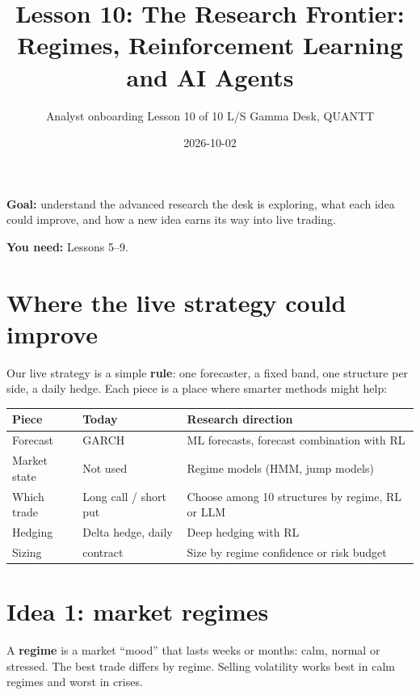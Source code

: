 \documentclass{article}
\title{Lesson 10: The Research Frontier: Regimes, Reinforcement Learning and AI Agents}
\author{Analyst onboarding \textperiodcentered{} Lesson 10 of 10 \textperiodcentered{} L/S Gamma Desk, QUANTT}
\date{2026-10-02}
\begin{document}
\maketitle

\textbf{Goal:} understand the advanced research the desk is exploring, what each idea could improve, and how a new idea earns its way into live trading.

\textbf{You need:} Lessons 5--9.

\section{Where the live strategy could improve}

Our live strategy is a simple \textbf{rule}: one forecaster, a fixed band, one structure per side, a daily hedge. Each piece is a place where smarter methods might help:

\begin{center}\small
\begin{tabularx}{\linewidth}{l >{\raggedright\arraybackslash}X >{\raggedright\arraybackslash}X}
\toprule
\textbf{Piece} & \textbf{Today} & \textbf{Research direction} \\
\midrule
Forecast & GARCH & ML forecasts, forecast combination with RL \\
Market state & Not used & Regime models (HMM, jump models) \\
Which trade & Long call /\allowbreak{} short put & Choose among 10 structures by regime, RL or LLM \\
Hedging & Delta hedge, daily & Deep hedging with RL \\
Sizing & 1 contract & Size by regime confidence or risk budget \\
\bottomrule
\end{tabularx}
\end{center}

\section{Idea 1: market regimes}

A \textbf{regime} is a market ``mood'' that lasts weeks or months: calm, normal or stressed. The best trade differs by regime. Selling volatility works best in calm regimes and worst in crises.
\end{document}
